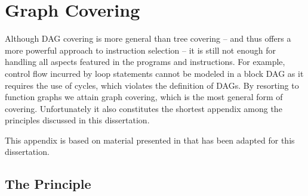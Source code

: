 %

\chapter{Graph Covering}



Although \gls{DAG covering} is more general than \gls{tree covering} -- and thus
offers a more powerful approach to \gls{instruction selection} -- it is still
not enough for handling all aspects featured in the \glspl{program} and
\glspl{instruction}.
%
For example, control flow incurred by loop statements cannot be modeled in a
\gls{block DAG} as it requires the use of \glspl{cycle}, which violates the
definition of \glspl{DAG}.
%
By resorting to \glspl{function graph} we attain \gls{graph covering}, which is
the most general form of covering.
%
Unfortunately it also constitutes the shortest appendix among the
\glspl{principle} discussed in this dissertation.

This appendix is based on material presented in
\cite[Chap.]{HjortBlindell:2016:Survey} that has been adapted for
this dissertation.


\section{The Principle}


